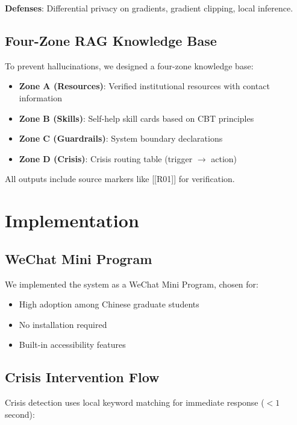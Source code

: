 \documentclass[preprint,12pt]{elsarticle}
\begin{document}
\textbf{Defenses}: Differential privacy on gradients, gradient clipping, local inference.

\subsection{Four-Zone RAG Knowledge Base}

To prevent hallucinations, we designed a four-zone knowledge base:

\begin{itemize}
    \item \textbf{Zone A (Resources)}: Verified institutional resources with contact information
    \item \textbf{Zone B (Skills)}: Self-help skill cards based on CBT principles
    \item \textbf{Zone C (Guardrails)}: System boundary declarations
    \item \textbf{Zone D (Crisis)}: Crisis routing table (trigger $\rightarrow$ action)
\end{itemize}

All outputs include source markers like [[R01]] for verification.

\section{Implementation}

\subsection{WeChat Mini Program}

We implemented the system as a WeChat Mini Program, chosen for:
\begin{itemize}
    \item High adoption among Chinese graduate students
    \item No installation required
    \item Built-in accessibility features
\end{itemize}

\subsection{Crisis Intervention Flow}

Crisis detection uses local keyword matching for immediate response ($<1$ second):
\end{document}
